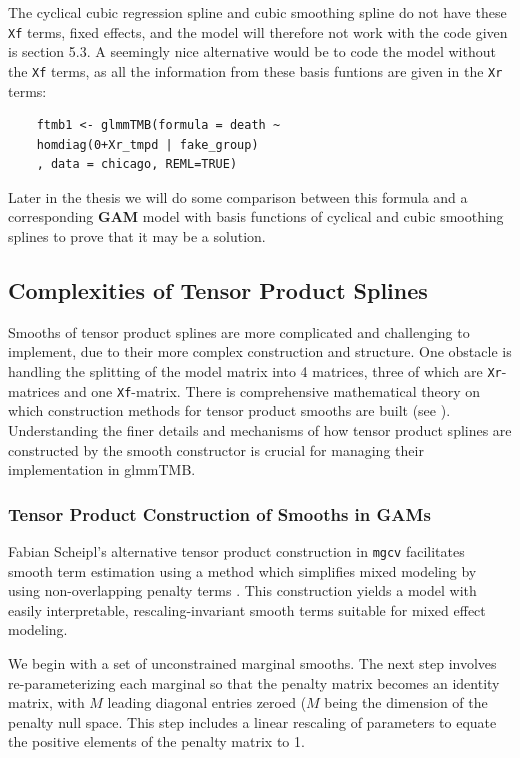 \documentclass[12pt, twoside,hidelinks]{article}
\theoremstyle{definition}
\numberwithin{equation}{section}
\begin{document}
The cyclical cubic regression spline and cubic smoothing spline do not have these \texttt{Xf} terms, fixed effects, and the model will therefore not work with the code given is section 5.3. A seemingly nice alternative would be to code the model without the \texttt{Xf} terms, as all the information from these basis funtions are given in the \texttt{Xr} terms:

\begin{verbatim}
    ftmb1 <- glmmTMB(formula = death ~ 
    homdiag(0+Xr_tmpd | fake_group)
    , data = chicago, REML=TRUE)
\end{verbatim}

Later in the thesis we will do some comparison between this formula and a corresponding \textbf{GAM} model with basis functions of cyclical and cubic smoothing splines to prove that it may be a solution.



\subsection{Complexities of Tensor Product Splines}

Smooths of tensor product splines are more complicated and challenging to implement, due to their more complex construction and structure. One obstacle is handling the splitting of the model matrix into 4 matrices, three of which are \texttt{Xr}-matrices and one \texttt{Xf}-matrix. There is comprehensive mathematical theory on which construction methods for tensor product smooths are built (see \cite{wood2017}). Understanding the finer details and mechanisms of how tensor product splines are constructed by the smooth constructor is crucial for managing their implementation in glmmTMB. 

\subsubsection{Tensor Product Construction of Smooths in GAMs}

Fabian Scheipl's alternative tensor product construction in \texttt{mgcv} facilitates smooth term estimation using a method which simplifies mixed modeling by using non-overlapping penalty terms \cite{wood2017}. This construction yields a model with easily interpretable, rescaling-invariant smooth terms suitable for mixed effect modeling.

We begin with a set of unconstrained marginal smooths. The next step involves re-parameterizing each marginal so that the penalty matrix becomes an identity matrix, with \( M \) leading diagonal entries zeroed (\( M \) being the dimension of the penalty null space. This step includes a linear rescaling of parameters to equate the positive elements of the penalty matrix to 1.
\newline
\end{document}
